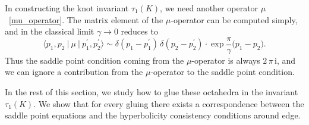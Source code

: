\documentclass[12pt]{article}
\numberwithin{equation}{section}
\begin{document}


In constructing the knot invariant $\tau_1(K)$, we need another
operator $\mu$~\eqref{mu_operator}.
The  matrix element of the  $\mu$-operator
can be computed simply,
and  in the classical  limit $\gamma \to 0$ reduces to
\begin{equation}
  \langle p_1 , p_2 \ | \ \mu \ | \ p_1^\prime , p_2^\prime \rangle
  \sim
  \delta(p_1 - p_1^\prime) \, \delta(p_2 - p_2^\prime) \cdot
  \exp \frac{\pi}{\gamma} \bigl( p_1 - p_2 \bigr) .
\end{equation}
Thus
the saddle point condition coming  from the $\mu$-operator is always
$2 \, \pi \, \mathrm{i}$, and
we can ignore
a  contribution  from the $\mu$-operator
to the saddle point condition.



In the rest of this   section, we 
study how to glue these octahedra in the invariant $\tau_1(K)$.
We   show that for every gluing
there exists  a  correspondence between the
saddle point equations and the hyperbolicity consistency conditions
around edge.
\end{document}
